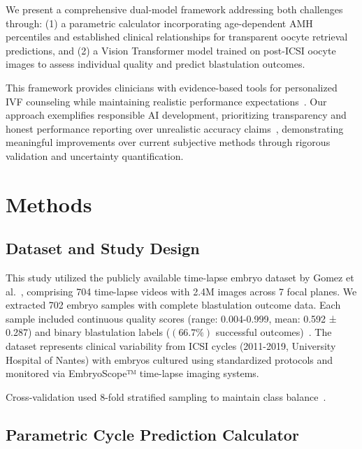 \documentclass[pdflatex,sn-basic]{sn-jnl}%
\begin{document}
We present a comprehensive dual-model framework addressing both challenges through: (1) a parametric calculator incorporating age-dependent AMH percentiles and established clinical relationships for transparent oocyte retrieval predictions, and (2) a Vision Transformer model trained on post-ICSI oocyte images to assess individual quality and predict blastulation outcomes.

This framework provides clinicians with evidence-based tools for personalized IVF counseling while maintaining realistic performance expectations~\cite{asrm2021counselors}. Our approach exemplifies responsible AI development, prioritizing transparency and honest performance reporting over unrealistic accuracy claims~\cite{varoquaux2022machine}, demonstrating meaningful improvements over current subjective methods through rigorous validation and uncertainty quantification. 

\section{Methods}\label{sec:methods}

\subsection{Dataset and Study Design}\label{subsec:dataset}

This study utilized the publicly available time-lapse embryo dataset by Gomez et al.~\cite{gomez2022timelapse}, comprising 704 time-lapse videos with 2.4M images across 7 focal planes. We extracted 702 embryo samples with complete blastulation outcome data. Each sample included continuous quality scores (range: 0.004-0.999, mean: 0.592 ± 0.287) and binary blastulation labels ($(66.7\%)$ successful outcomes)~\cite{awadalla2021age,zhu2024developmental}. The dataset represents clinical variability from ICSI cycles (2011-2019, University Hospital of Nantes) with embryos cultured using standardized protocols and monitored via EmbryoScope™ time-lapse imaging systems.

Cross-validation used 8-fold stratified sampling to maintain class balance~\cite{hastie2009elements}.

\subsection{Parametric Cycle Prediction Calculator}\label{subsec:calculator}
\end{document}
